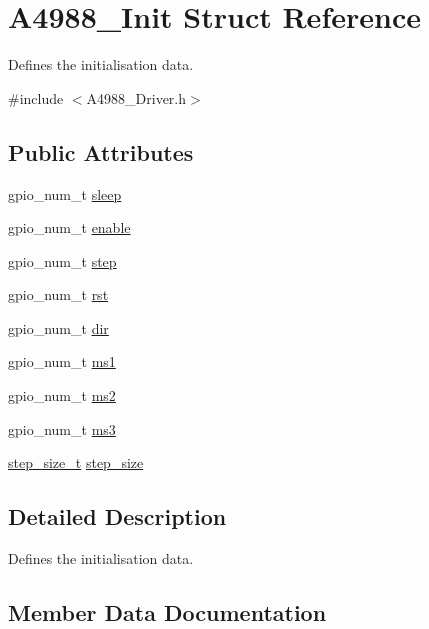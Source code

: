 \hypertarget{structA4988__Init}{}\section{A4988\+\_\+\+Init Struct Reference}
\label{structA4988__Init}


Defines the initialisation data.  




{\ttfamily \#include $<$A4988\+\_\+\+Driver.\+h$>$}

\subsection*{Public Attributes}
\begin{DoxyCompactItemize}
\item 
gpio\+\_\+num\+\_\+t \hyperlink{structA4988__Init_ae4c5d92364b12c390642e9118b55d4b5}{sleep}
\item 
gpio\+\_\+num\+\_\+t \hyperlink{structA4988__Init_ab7380c6735bb0c40a4a95dfc8ff6ac1f}{enable}
\item 
gpio\+\_\+num\+\_\+t \hyperlink{structA4988__Init_a80c66f6a33ad5eaa8687cb158c158c95}{step}
\item 
gpio\+\_\+num\+\_\+t \hyperlink{structA4988__Init_ae2219a7fac36bf82c31eedc4782274eb}{rst}
\item 
gpio\+\_\+num\+\_\+t \hyperlink{structA4988__Init_a82b9f53041b03ea917b61b4818ebca6c}{dir}
\item 
gpio\+\_\+num\+\_\+t \hyperlink{structA4988__Init_a742a80f86dd8c1ebb2913087e9eb2828}{ms1}
\item 
gpio\+\_\+num\+\_\+t \hyperlink{structA4988__Init_af0be9556e7e0283df0e6669ddf0d09ee}{ms2}
\item 
gpio\+\_\+num\+\_\+t \hyperlink{structA4988__Init_afa3424409a5d095cdcbb581db294b0cf}{ms3}
\item 
\hyperlink{group__A4988__definitions_gad84fc402211d9487e63ee884e4d79531}{step\+\_\+size\+\_\+t} \hyperlink{structA4988__Init_a4e0ca5ac2bb809dc60dab333c6d6142f}{step\+\_\+size}
\end{DoxyCompactItemize}


\subsection{Detailed Description}
Defines the initialisation data. 

\subsection{Member Data Documentation}
\mbox{\label{structA4988__Init_a82b9f53041b03ea917b61b4818ebca6c}} 
